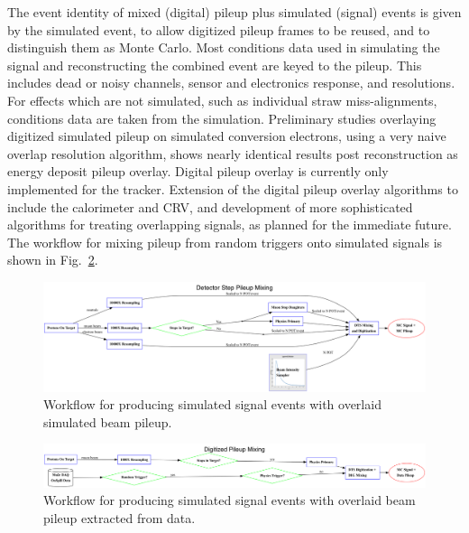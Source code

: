 The event identity of mixed (digital) pileup plus simulated (signal) events is given by the simulated event, to allow digitized pileup frames to be reused, and to distinguish them as Monte Carlo. Most conditions data used in simulating the signal and reconstructing the combined event are keyed to the pileup. This includes dead or noisy channels, sensor and electronics response, and resolutions. For effects which are not simulated, such as individual straw miss-alignments, conditions data are taken from the simulation. Preliminary studies overlaying digitized simulated pileup on simulated conversion electrons, using a very naive overlap resolution algorithm, shows nearly identical results post reconstruction as energy deposit pileup overlay. Digital pileup overlay is currently only implemented for the tracker. Extension of the digital pileup overlay algorithms to include the calorimeter and CRV, and development of more sophisticated algorithms for treating overlapping signals, as planned for the immediate future. The workflow for mixing pileup from random triggers onto simulated signals is shown in Fig.~\ref{fig:dig_mixing}.

\begin{figure}[ht!]
\centering
\includegraphics[width=\textwidth]{figures/DTS_Mixing.png}%
\caption{Workflow for producing simulated signal events with overlaid simulated beam pileup.}
\label{fig:dts_mixing}
\end{figure}

\begin{figure}[ht!]
\centering
\includegraphics[width=\textwidth]{figures/DIG_Mixing.png}%
\caption{Workflow for producing simulated signal events with overlaid beam pileup extracted from data.}
\label{fig:dig_mixing}
\end{figure}

